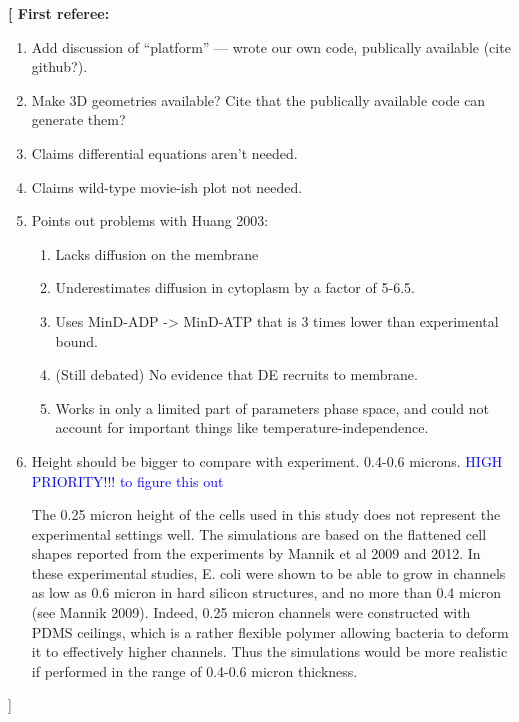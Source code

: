 \documentclass[10pt,letterpaper]{article}
\newcommand{\red}[1]{{\bf \color{red} #1}}
\newcommand{\fixme}[1]{\red{[#1]}}
\begin{document}
\fixme{
  First referee:
  \begin{enumerate}
  \item Add discussion of ``platform'' --- wrote our own code,
    publically available (cite github?).
  \item Make 3D geometries available? Cite that the publically
    available code can generate them?
  \item Claims differential equations aren't needed.
  \item Claims wild-type movie-ish plot not needed.
  \item Points out problems with Huang 2003:
    \begin{enumerate}
    \item Lacks diffusion on the membrane
    \item Underestimates diffusion in cytoplasm by a factor of 5-6.5.
    \item Uses MinD-ADP -> MinD-ATP that is 3 times lower than
      experimental bound.
    \item (Still debated) No evidence that DE recruits to membrane.
    \item Works in only a limited part of parameters phase space, and
      could not account for important things like
      temperature-independence.
    \end{enumerate}
  \item Height should be bigger to compare with experiment.  0.4-0.6
    microns.  \textcolor{blue}{HIGH PRIORITY!!! to figure this out}

    The 0.25 micron height of the cells used in this study does not
    represent the experimental settings well. The simulations are
    based on the flattened cell shapes reported from the experiments
    by Mannik et al 2009 and 2012. In these experimental studies,
    E. coli were shown to be able to grow in channels as low as 0.6
    micron in hard silicon structures, and no more than 0.4 micron
    (see Mannik 2009). Indeed, 0.25 micron channels were constructed
    with PDMS ceilings, which is a rather flexible polymer allowing
    bacteria to deform it to effectively higher channels. Thus the
    simulations would be more realistic if performed in the range of
    0.4-0.6 micron thickness.


\end{enumerate}}
\end{document}
